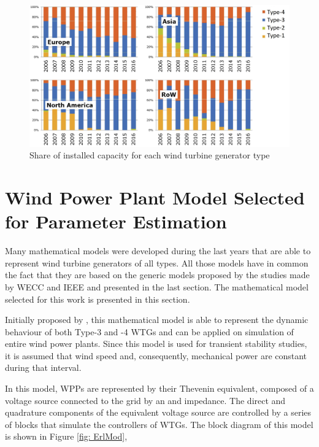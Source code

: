 \begin{figure}[h]
	\caption{Share of installed capacity for each wind turbine generator type}
	\begin{center}
		\includegraphics[scale=.2]{Images/WTGTypes.jpg}
	\end{center}
	\label{fig: WindShare}
\end{figure}

\section{Wind Power Plant Model Selected for Parameter Estimation}
\label{sec: WPP_model}

Many mathematical models were developed during the last years that are able to represent wind turbine generators of all types. All those models have in common the fact that they are based on the generic models proposed by the studies made by WECC and IEEE and presented in the last section. The mathematical model selected for this work is presented in this section.

Initially proposed by \cite{Erlich2012}, this mathematical model is able to represent the dynamic behaviour of both Type-3 and -4 WTGs and can be applied on simulation of entire wind power plants. Since this model is used for transient stability studies, it is assumed that wind speed and, consequently, mechanical power are constant during that interval.

In this model, WPPs are represented by their Thevenin equivalent, composed of  a voltage source connected to the grid by an and impedance. The direct and quadrature components of the equivalent voltage source are controlled by a series of blocks that simulate the controllers of WTGs. The block diagram of this model is shown in Figure \ref{fig: ErlMod},

